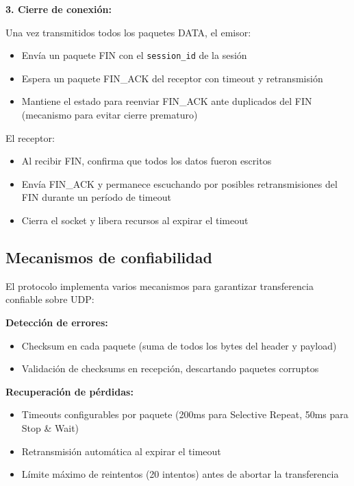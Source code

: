 \begin{enumerate}
    \textbf{3. Cierre de conexión:}
    
    Una vez transmitidos todos los paquetes DATA, el emisor:
    \begin{itemize}
        \item Envía un paquete FIN con el \texttt{session\_id} de la sesión
        \item Espera un paquete FIN\_ACK del receptor con timeout y retransmisión
        \item Mantiene el estado para reenviar FIN\_ACK ante duplicados del FIN (mecanismo para evitar cierre prematuro)
    \end{itemize}
    
    El receptor:
    \begin{itemize}
        \item Al recibir FIN, confirma que todos los datos fueron escritos
        \item Envía FIN\_ACK y permanece escuchando por posibles retransmisiones del FIN durante un período de timeout
        \item Cierra el socket y libera recursos al expirar el timeout
    \end{itemize}
    
    \subsection*{Mecanismos de confiabilidad}
    
    El protocolo implementa varios mecanismos para garantizar transferencia confiable sobre UDP:
    
    \textbf{Detección de errores:}
    \begin{itemize}
        \item Checksum en cada paquete (suma de todos los bytes del header y payload)
        \item Validación de checksums en recepción, descartando paquetes corruptos
    \end{itemize}
    
    \textbf{Recuperación de pérdidas:}
    \begin{itemize}
        \item Timeouts configurables por paquete (200ms para Selective Repeat, 50ms para Stop \& Wait)
        \item Retransmisión automática al expirar el timeout
        \item Límite máximo de reintentos (20 intentos) antes de abortar la transferencia
    \end{itemize}
    

\end{enumerate}
